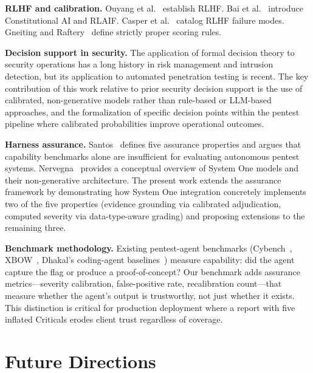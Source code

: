 \documentclass[conference]{IEEEtran}
\begin{document}
\textbf{RLHF and calibration.} Ouyang et al.~\cite{ouyang2022training} establish RLHF. Bai et al.~\cite{bai2022constitutional} introduce Constitutional AI and RLAIF. Casper et al.~\cite{casper2023open} catalog RLHF failure modes. Gneiting and Raftery~\cite{gneiting2007strictly} define strictly proper scoring rules.

\textbf{Decision support in security.} The application of formal decision theory to security operations has a long history in risk management and intrusion detection, but its application to automated penetration testing is recent. The key contribution of this work relative to prior security decision support is the use of calibrated, non-generative models rather than rule-based or LLM-based approaches, and the formalization of specific decision points within the pentest pipeline where calibrated probabilities improve operational outcomes.

\textbf{Harness assurance.} Santos~\cite{santos2026assurance} defines five assurance properties and argues that capability benchmarks alone are insufficient for evaluating autonomous pentest systems. Nervegna~\cite{nervegna2026jev} provides a conceptual overview of System One models and their non-generative architecture. The present work extends the assurance framework by demonstrating how System One integration concretely implements two of the five properties (evidence grounding via calibrated adjudication, computed severity via data-type-aware grading) and proposing extensions to the remaining three.

\textbf{Benchmark methodology.} Existing pentest-agent benchmarks (Cybench~\cite{cybench2024}, XBOW~\cite{david2025mapta}, Dhakal's coding-agent baselines~\cite{dhakal2026baselines}) measure capability: did the agent capture the flag or produce a proof-of-concept? Our benchmark adds assurance metrics---severity calibration, false-positive rate, recalibration count---that measure whether the agent's output is trustworthy, not just whether it exists. This distinction is critical for production deployment where a report with five inflated Criticals erodes client trust regardless of coverage.

\section{Future Directions}\label{sec:future}
\end{document}
